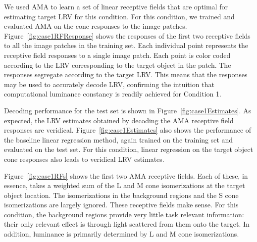 \documentclass{jov}
\begin{document}
We used AMA to learn a set of linear receptive fields that are optimal for estimating target LRV for this condition.
For this condition, we trained and evaluated AMA on the cone responses to the image patches.
Figure~\ref{fig:case1RFResponse} shows the responses of the first two receptive fields to all the image patches in the training set.
Each individual point represents the receptive field responses to a single image patch.
Each point is color coded according to the LRV corresponding to the target object in the patch.
The responses segregate according to the target LRV.
This means that the responses may be used to accurately decode LRV, confirming the intuition that computational
luminance constancy is readily achieved for Condition 1.

Decoding performance for the test set is shown in Figure~\ref{fig:case1Estimates}.
As expected, the LRV estimates obtained by decoding the AMA receptive field responses are veridical.
Figure~\ref{fig:case1Estimates} also shows the performance of the baseline linear regression method, again trained
on the training set and evaluated on the test set.
For this condition, linear regression on the target object cone responses also leads to veridical LRV estimates.

Figure~\ref{fig:case1RFs} shows the first two AMA receptive fields.
Each of these, in essence, takes a weighted sum of the L and M cone isomerizations at the target object location.
The isomerizations in the background regions and the S cone isomerizations are largely ignored.
These receptive fields make sense.
For this condition, the background regions provide very little task relevant information: their only relevant effect is
through light scattered from them onto the target.
In addition, luminance is primarily determined by L and M cone isomerizations.
\end{document}
